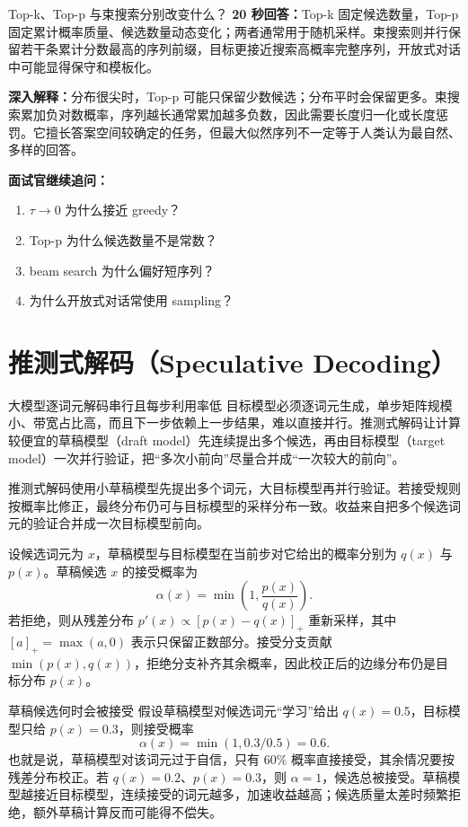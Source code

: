 \begin{interviewbox}{Top-k、Top-p 与束搜索分别改变什么？}
\textbf{20 秒回答：}Top-k 固定候选数量，Top-p 固定累计概率质量、候选数量动态变化；两者通常用于随机采样。束搜索则并行保留若干条累计分数最高的序列前缀，目标更接近搜索高概率完整序列，开放式对话中可能显得保守和模板化。

\textbf{深入解释：}分布很尖时，Top-p 可能只保留少数候选；分布平时会保留更多。束搜索累加负对数概率，序列越长通常累加越多负数，因此需要长度归一化或长度惩罚。它擅长答案空间较确定的任务，但最大似然序列不一定等于人类认为最自然、多样的回答。

\textbf{面试官继续追问：}
\begin{enumerate}
  \item $\tau\to0$ 为什么接近 greedy？
  \item Top-p 为什么候选数量不是常数？
  \item beam search 为什么偏好短序列？
  \item 为什么开放式对话常使用 sampling？
\end{enumerate}
\end{interviewbox}

\section{推测式解码（Speculative Decoding）}
\label{sec:speculative}

\begin{motivationbox}{大模型逐词元解码串行且每步利用率低}
目标模型必须逐词元生成，单步矩阵规模小、带宽占比高，而且下一步依赖上一步结果，难以直接并行。推测式解码让计算较便宜的草稿模型（draft model）先连续提出多个候选，再由目标模型（target model）一次并行验证，把“多次小前向”尽量合并成“一次较大的前向”。
\end{motivationbox}

推测式解码使用小草稿模型先提出多个词元，大目标模型再并行验证。若接受规则按概率比修正，最终分布仍可与目标模型的采样分布一致。收益来自把多个候选词元的验证合并成一次目标模型前向。

设候选词元为 $x$，草稿模型与目标模型在当前步对它给出的概率分别为 $q(x)$ 与 $p(x)$。草稿候选 $x$ 的接受概率为
\[
\alpha(x)=\min\!\left(1,\frac{p(x)}{q(x)}\right).
\]
若拒绝，则从残差分布 $p'(x)\propto[p(x)-q(x)]_+$ 重新采样，其中 $[a]_+=\max(a,0)$ 表示只保留正数部分。接受分支贡献 $\min(p(x),q(x))$，拒绝分支补齐其余概率，因此校正后的边缘分布仍是目标分布 $p(x)$。

\begin{examplebox}{草稿候选何时会被接受}
假设草稿模型对候选词元“学习”给出 $q(x)=0.5$，目标模型只给 $p(x)=0.3$，则接受概率
\[
\alpha(x)=\min(1,0.3/0.5)=0.6.
\]
也就是说，草稿模型对该词元过于自信，只有 $60\%$ 概率直接接受，其余情况要按残差分布校正。若 $q(x)=0.2$、$p(x)=0.3$，则 $\alpha=1$，候选总被接受。草稿模型越接近目标模型，连续接受的词元越多，加速收益越高；候选质量太差时频繁拒绝，额外草稿计算反而可能得不偿失。
\end{examplebox}

